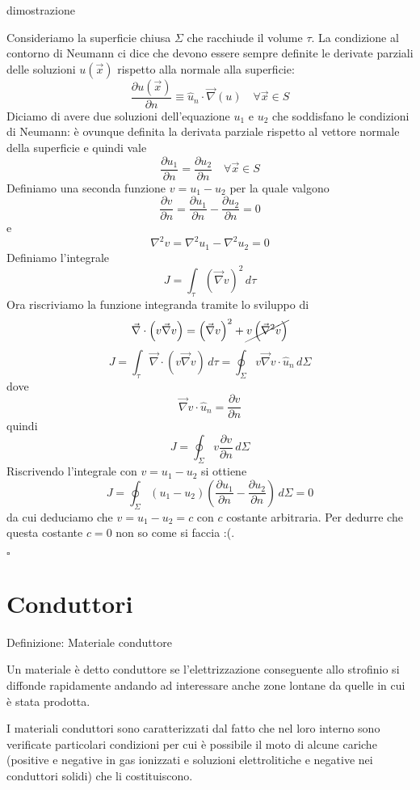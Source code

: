\documentclass[x11names]{report}
\newcommand*{\QEDB}{\null\nobreak\hfill\ensuremath{\square}}%
\newcommand{\definizione}[2]{
	\begin{center}
		\fboxsep11pt
		\colorbox{myblue}{\begin{minipage}{5.75in}
				\begin{blues}{Definizione: #1}
					#2
				\end{blues}
		\end{minipage}}
	\end{center}
}
\newcommand{\dimostrazione}[2]{
	\begin{dym}{dimostrazione#1}
		#2
		\QEDB
	\end{dym}
}
\begin{document}
\dimostrazione{}{
Consideriamo la superficie chiusa \(\Sigma\) che racchiude il volume \(\tau\). La condizione al contorno di Neumann ci dice che devono essere sempre definite le derivate parziali delle soluzioni \(u(\vec{x})\) rispetto alla normale alla superficie:
\[
\frac{\partial u(\vec{x})}{\partial n} \equiv \hat{u}_n \cdot \vec{\nabla}(u) \quad \forall \vec{x} \in S 
\]
Diciamo di avere due soluzioni dell'equazione \(u_1\) e \(u_2\) che soddisfano le condizioni di Neumann: è ovunque definita la derivata parziale rispetto al vettore normale della superficie e quindi vale 
\[
\frac{\partial u_1}{\partial n}  =  \frac{\partial u_2}{\partial n} \quad \forall \vec{x} \in S
\] 
Definiamo una seconda funzione \(v = u_1 - u_2\) per la quale valgono
\[
\frac{\partial v}{\partial n} = \frac{\partial u_1}{\partial n} - \frac{\partial u_2}{\partial n} = 0
\]
e 
\[
\nabla^2 v = \nabla^2 u_1 - \nabla^2 u_2 = 0
\]
Definiamo l'integrale
\[
J = \int_\tau \left(\vec{\nabla} v\right)^2 \, d\tau
\]
Ora riscriviamo la funzione integranda tramite lo sviluppo di 
\[
\vec{\nabla} \cdot \left(v\vec{\nabla}v\right) = \left(\vec{\nabla} v\right)^2 + \cancel{v\left(\vec{\nabla}^2 v\right) }
\]
\[
J = \int_\tau \vec{\nabla} \cdot \left(v\vec{\nabla}v\right) \, d\tau = \oint_\Sigma v\vec{\nabla}v \cdot \hat{u}_n \, d\Sigma
\]
dove 
\[
\vec{\nabla}v \cdot \hat{u}_n = \frac{\partial v}{\partial n}
\]
quindi
\[
J = \oint_\Sigma v \frac{\partial v}{\partial n} \, d\Sigma
\]
Riscrivendo l'integrale con \(v = u_1 - u_2\) si ottiene
\[
J = \oint_\Sigma (u_1 - u_2) \left(\frac{\partial u_1}{\partial n} - \frac{\partial u_2}{\partial n}\right) \, d\Sigma = 0
\]
da cui deduciamo che \(v = u_1 - u_2 = c\) con \(c\) costante arbitraria. Per dedurre che questa costante \(c=0\) non so come si faccia :(.
}
\newpage
\section{Conduttori}
\definizione{Materiale conduttore}{
	Un materiale è detto conduttore se l'elettrizzazione conseguente allo strofinio si diffonde rapidamente andando ad interessare anche zone lontane da quelle in cui è stata prodotta. 
}
I materiali conduttori sono caratterizzati dal fatto che nel loro interno sono verificate particolari condizioni per cui è possibile il moto di alcune cariche (positive e negative in gas ionizzati e soluzioni elettrolitiche e negative nei conduttori solidi) che li costituiscono.
\end{document}
